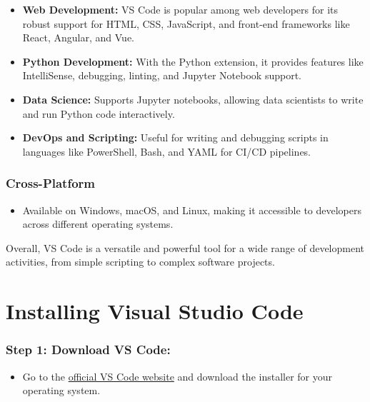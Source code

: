 \documentclass[
  letterpaper,
  DIV=11,
  numbers=noendperiod]{scrreprt}
\providecommand{\tightlist}{%
  \setlength{\itemsep}{0pt}\setlength{\parskip}{0pt}}\usepackage{longtable,booktabs,array}
\begin{document}
\begin{itemize}
\tightlist
\item
  \textbf{Web Development:} VS Code is popular among web developers for
  its robust support for HTML, CSS, JavaScript, and front-end frameworks
  like React, Angular, and Vue.
\item
  \textbf{Python Development:} With the Python extension, it provides
  features like IntelliSense, debugging, linting, and Jupyter Notebook
  support.
\item
  \textbf{Data Science:} Supports Jupyter notebooks, allowing data
  scientists to write and run Python code interactively.
\item
  \textbf{DevOps and Scripting:} Useful for writing and debugging
  scripts in languages like PowerShell, Bash, and YAML for CI/CD
  pipelines.
\end{itemize}

\hypertarget{cross-platform}{%
\subsubsection{Cross-Platform}\label{cross-platform}}

\begin{itemize}
\tightlist
\item
  Available on Windows, macOS, and Linux, making it accessible to
  developers across different operating systems.
\end{itemize}

Overall, VS Code is a versatile and powerful tool for a wide range of
development activities, from simple scripting to complex software
projects.

\hypertarget{installing-visual-studio-code}{%
\section{Installing Visual Studio
Code}\label{installing-visual-studio-code}}

\hypertarget{step-1-download-vs-code}{%
\subsubsection{\texorpdfstring{Step 1: \textbf{Download VS
Code:}}{Step 1: Download VS Code:}}\label{step-1-download-vs-code}}

\begin{itemize}
\tightlist
\item
  Go to the \href{https://code.visualstudio.com/}{official VS Code
  website} and download the installer for your operating system.
\end{itemize}
\end{document}
